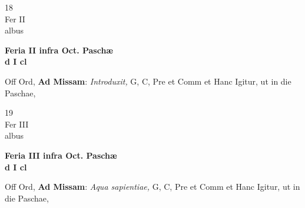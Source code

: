\documentclass[10pt, openany]{book}
\begin{document}
        \begin{center}
            \begin{minipage}{3.5in}
                \vspace{2em}
                \begin{minipage}{0.5in}
                    {\Huge 18} \\
                    {\normalsize Fer II} \\
                    {\normalsize albus}
                \end{minipage}
                \begin{minipage}{3.0in}
                    \textbf{ \large Feria II infra Oct. Paschæ \\
                    \textnormal{\normalsize d I cl}} \\ 
                \end{minipage}
                \begin{justify}Off Ord, \textbf{Ad Missam}: \textit{Introduxit,} G, C, Pre et Comm et Hanc Igitur, ut in die Paschae,  
                \end{justify}
            \end{minipage}
        \end{center}
    
        \begin{center}
            \begin{minipage}{3.5in}
                \vspace{2em}
                \begin{minipage}{0.5in}
                    {\Huge 19} \\
                    {\normalsize Fer III} \\
                    {\normalsize albus}
                \end{minipage}
                \begin{minipage}{3.0in}
                    \textbf{ \large Feria III infra Oct. Paschæ \\
                    \textnormal{\normalsize d I cl}} \\ 
                \end{minipage}
                \begin{justify}Off Ord, \textbf{Ad Missam}: \textit{Aqua sapientiae,} G, C, Pre et Comm et Hanc Igitur, ut in die Paschae,  
                \end{justify}
            \end{minipage}
        \end{center}
    
\end{document}
